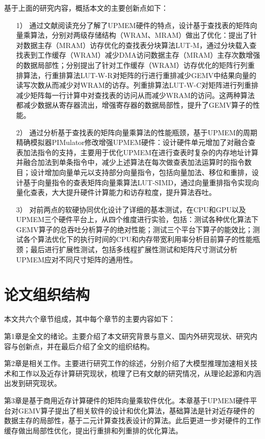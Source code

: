基于上面的研究内容，概括本文的主要创新点如下：
\begin{itemize}
	\item [1）]
	通过文献阅读充分了解了UPMEM硬件的特点，设计基于查找表的矩阵向量乘算法，分别对两级存储结构（WRAM、MRAM）做出了优化：提出了针对数据主存（MRAM）访存优化的查找表分块算法LUT-M，通过分块载入查找表到工作缓存（WRAM）减少DMA访问数据主存（MRAM）主存次数增强的数据局部性；分别提出了针对工作缓存（WRAM）访存优化的矩阵行列重排算法，行重排算法LUT-W-R对矩阵的行进行重排减少GEMV中结果向量的读写次数从而减少对WRAM的访存。列重排算法LUT-W-C对矩阵进行列重排减少矩阵每一行计算中对查找表的访问从而减少WRAM的访问。这两种算法都减少数据从寄存器流出，增强寄存器的数据局部性，提升了GEMV算子的性能。
	\item [2）]
	通过分析基于查找表的矩阵向量乘算法的性能瓶颈，基于UPMEM的周期精确模拟器PIMulator修改增强UPMEM硬件：设计硬件单元增加了对融合查表加法指令的支持，主要用于优化UPMEM在进行查表时复杂的内存地址计算并融合加法到单条指令中，减少上述算法在每次做查表加法运算时的指令数目；设计增加向量单元以支持部分向量指令，包括向量加法、移位和重排，设计基于向量指令的查表矩阵向量乘算法LUT-SIMD，通过向量重排指令实现向量化查表，大大提升硬件计算能力和访存粒度，提升算法吞吐。
    \item [3）]
	对前两点的软硬协同优化设计了详细的基本测试，在CPU和GPU以及UPMEM三个硬件平台上，从四个维度进行实验，包括：测试各种优化算法下GEMV算子的总吞吐分析算子的绝对性能；测试三个平台下算子的能效比；测试各个算法优化下的执行时间的CPU和内存带宽利用率分析目前算子的性能瓶颈；最后进行扩展性测试，包括多线程扩展性测试和矩阵尺寸测试分析UPMEM应对不同尺寸矩阵的通用性。
\end{itemize}

\section{论文组织结构}
本文共六个章节组成，其中每个章节的主要内容如下：

第1章是全文的绪论。主要介绍了本文研究背景与意义、国内外研究现状、研究内容与创新点，并在最后介绍了全文的组织结构。

第2章是相关工作。主要进行研究工作的综述，分别介绍了大模型推理加速相关技术和工作以及近存计算研究现状，梳理了已有文献的研究情况，从理论起源和内涵出发到研究现状。

第3章是基于商用近存计算硬件的矩阵向量乘软件优化。本章基于UPMEM硬件平台对GEMV算子提出了相关软件的设计和优化算法，基础算法是针对近存硬件的数据主存的局部性，基于二元计算查找表设计的算法。此后更进一步对硬件的工作缓存做出局部性优化，提出行重排和列重排的优化算法。

